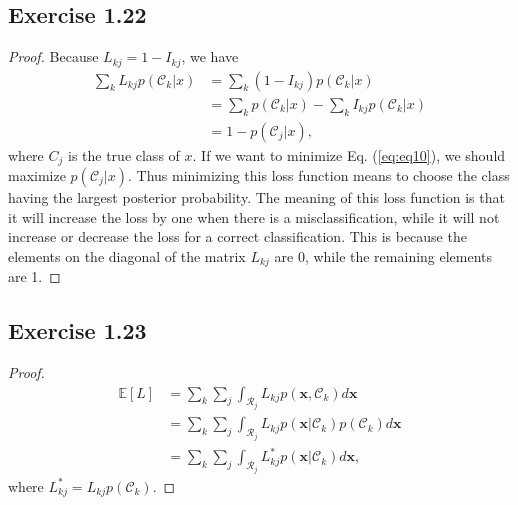 \documentclass[11pt]{article}
\theoremstyle{definition}
\newcommand{\E}{\mathbb{E}}
\begin{document}
\subsection{Exercise 1.22}
\begin{proof}
Because $L_{kj} = 1 - I_{kj}$, we have
\begin{align}
\sum_kL_{kj}p(\mathcal{C}_k|x) &= \sum_k(1-I_{kj})p(\mathcal{C}_k|x) \nonumber\\
&= \sum_kp(\mathcal{C}_k|x) - \sum_kI_{kj}p(\mathcal{C}_k|x) \nonumber\\
&= 1 - p(\mathcal{C}_j|x), \label{eq:eq10}
\end{align}
where $C_j$ is the true class of $x$. If we want to minimize Eq. (\ref{eq:eq10}), we should maximize $p(\mathcal{C}_j|x)$. Thus minimizing this loss function means to choose the class having the largest posterior probability. The meaning of this loss function is that it will increase the loss by one when there is a misclassification, while it will not increase or decrease the loss for a correct classification. This is because the elements on the diagonal of the matrix $L_{kj}$ are 0, while the remaining elements are 1.
\end{proof}

\subsection{Exercise 1.23}
\begin{proof}
\begin{align*}
\E[L] &= \sum_k\sum_j\int_{\mathcal{R}_j}L_{kj}p(\textbf{x}, \mathcal{C}_k)d\textbf{x} \\
&= \sum_k\sum_j\int_{\mathcal{R}_j}L_{kj}p(\textbf{x}|\mathcal{C}_k)p(\mathcal{C}_k)d\textbf{x} \\
&= \sum_k\sum_j\int_{\mathcal{R}_j}L_{kj}^{*}p(\textbf{x}|\mathcal{C}_k)d\textbf{x},
\end{align*}
where $L_{kj}^{*} = L_{kj}p(\mathcal{C}_k)$.
\end{proof}
\end{document}
